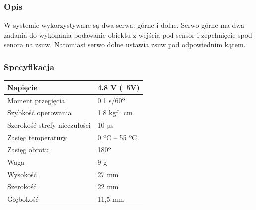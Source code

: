\documentclass[12pt]{article}
\begin{document}
\subsubsection{Opis}
W systemie wykorzystywane są dwa serwa: górne i dolne. Serwo górne ma dwa zadania do wykonania podawanie obiektu z wejścia pod sensor i zepchnięcie spod senora na zsuw. Natomiast serwo dolne ustawia zsuw pod odpowiednim kątem.
\subsubsection{Specyfikacja}
\begin{center}
\begin{tabular}{ | m{5cm} | m{3cm} | } 
\hline
Napięcie &  4.8 V (~5V)\\ 
\hline
Moment przegięcia & 0.1 s/60º\\ 
\hline
Szybkość operowania & 1.8 kgf·cm\\ 
\hline
Szerokość strefy nieczułości & 10 µs \\ 
\hline
Zasięg temperatury &  0 ºC – 55 ºC  \\ 
\hline
Zasięg obrotu &  180º  \\ 
\hline
Waga &  9 g  \\ 
\hline
Wysokość & 27 mm\\
\hline
Szerokość & 22 mm\\
\hline
Głębokość & 11,5 mm\\
\hline
\end{tabular}
\end{center}
\end{document}
